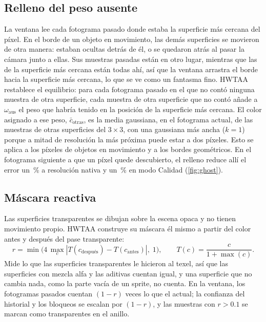 \documentclass[11pt,a4paper]{article}
\begin{document}
\subsection{Relleno del peso ausente}
\label{sec:missing}

La ventana lee cada fotograma pasado donde estaba la superficie más cercana del píxel. En el borde de un objeto en movimiento, las demás superficies se movieron de otra manera: estaban ocultas detrás de él, o se quedaron atrás al pasar la cámara junto a ellas. Sus muestras pasadas están en otro lugar, mientras que las de la superficie más cercana están todas ahí, así que la ventana arrastra el borde hacia la superficie más cercana, lo que se ve como un fantasma fino. HWTAA restablece el equilibrio: para cada fotograma pasado en el que no contó ninguna muestra de otra superficie, cada muestra de otra superficie que no contó añade a $\omega_{\mathrm{aus}}$ el peso que habría tenido en la posición de la superficie más cercana. El color asignado a ese peso, $\bar c_{\mathrm{otras}}$, es la media gaussiana, en el fotograma actual, de las muestras de otras superficies del $3\times3$, con una gaussiana más ancha ($k=1$) porque a mitad de resolución la más próxima puede estar a dos píxeles. Esto se aplica a los píxeles de objetos en movimiento y a los bordes geométricos. En el fotograma siguiente a que un píxel quede descubierto, el relleno reduce allí el error un \nGhostCutNat\,\% a resolución nativa y un \nGhostCutQ\,\% en modo Calidad (\cref{fig:ghost}).

\subsection{Máscara reactiva}
\label{sec:reactive}

Las superficies transparentes se dibujan sobre la escena opaca y no tienen movimiento propio. HWTAA construye su máscara él mismo a partir del color antes y después del pase transparente:
\begin{equation}
r = \min\!\big(4\,\max_{c}|T(c_{\mathrm{después}}) - T(c_{\mathrm{antes}})|,\; 1\big), \qquad T(c) = \frac{c}{1+\max(c)}.
\end{equation}
Mide lo que las superficies transparentes le hicieron al texel, así que las superficies con mezcla alfa y las aditivas cuentan igual, y una superficie que no cambia nada, como la parte vacía de un sprite, no cuenta. En la ventana, los fotogramas pasados cuentan $(1-r)$ veces lo que el actual; la confianza del historial y los bloqueos se escalan por $(1-r)$, y las muestras con $r > 0.1$ se marcan como transparentes en el anillo.
\end{document}
